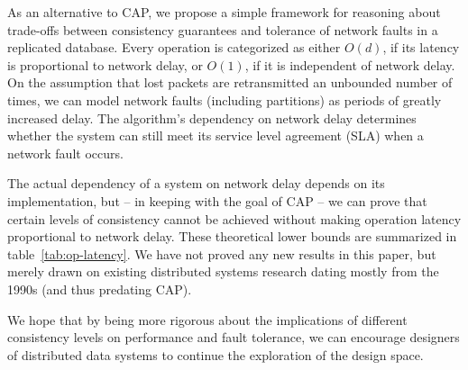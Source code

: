 \documentclass[a4paper,twocolumn,10pt]{article}
\begin{document}
As an alternative to CAP, we propose a simple framework for reasoning about trade-offs between
consistency guarantees and tolerance of network faults in a replicated database. Every operation is
categorized as either $O(d)$, if its latency is proportional to network delay, or $O(1)$, if it is
independent of network delay. On the assumption that lost packets are retransmitted an unbounded
number of times, we can model network faults (including partitions) as periods of greatly increased
delay. The algorithm's dependency on network delay determines whether the system can still meet its
service level agreement (SLA) when a network fault occurs.

The actual dependency of a system on network delay depends on its implementation, but -- in keeping
with the goal of CAP -- we can prove that certain levels of consistency cannot be achieved without
making operation latency proportional to network delay. These theoretical lower bounds are
summarized in table~\ref{tab:op-latency}. We have not proved any new results in this paper, but
merely drawn on existing distributed systems research dating mostly from the 1990s (and thus
predating CAP).

We hope that by being more rigorous about the implications of different consistency levels on
performance and fault tolerance, we can encourage designers of distributed data systems to continue
the exploration of the design space.

{\footnotesize

{}}
\end{document}
